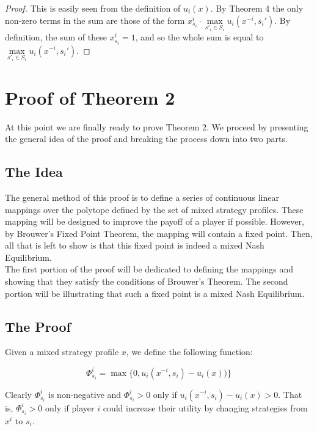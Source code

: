 \documentclass[12pt]{article}
\begin{document}
\begin{proof}
This is easily seen from the definition of $u_i(x)$. By Theorem 4 the only non-zero terms in the sum are those of the form $x^i_{s_i} \cdot \max\limits_{s'_i \in S_i}  u_i(x^{-i}, s_i')$. By definition, the sum of these $x^i_{s_i} = 1$, and so the whole sum is equal to $\max\limits_{s'_i \in S_i}  u_i(x^{-i}, s_i')$.
\end{proof}

\section{Proof of Theorem 2}

At this point we are finally ready to prove Theorem 2. We proceed by presenting the general idea of the proof and breaking the process down into two parts.\\

\subsection{The Idea}

The general method of this proof is to define a series of continuous linear mappings over the polytope defined by the set of mixed strategy profiles. These mapping will be designed to improve the payoff of a player if possible. However, by Brouwer's Fixed Point Theorem, the mapping will contain a fixed point. Then, all that is left to show is that this fixed point is indeed a mixed Nash Equilibrium.\\



The first portion of the proof will be dedicated to defining the mappings and showing that they satisfy the conditions of Brouwer's Theorem. The second portion will be illustrating that such a fixed point is a mixed Nash Equilibrium.

\subsection{The Proof}

Given a mixed strategy profile $x$, we define the following function:

\begin{equation*}
\Phi^i_{s_i} = \max\{ 0,u_i(x^{-i},s_i) - u_i(x))\}
\end{equation*}

Clearly $\Phi^i_{s_i}$ is non-negative and $\Phi^i_{s_i} > 0$ only if $u_i(x^{-i},s_i) - u_i(x) > 0$. That is, $\Phi^i_{s_i} > 0$ only if player $i$ could increase their utility by changing strategies from $x^i$ to $s_i$.\\
\end{document}
